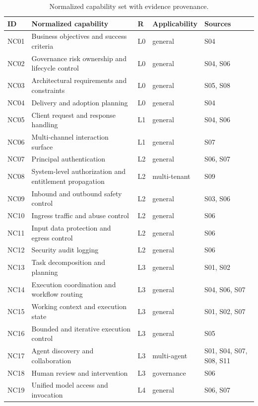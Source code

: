 \begin{table}[t]
\centering
\caption{Normalized capability set with evidence provenance.}
\label{tab:capability-set}
\scriptsize
\begin{tabular}{p{} p{} p{} p{} p{}}
\hline
\textbf{ID} & \textbf{Normalized capability} & \textbf{R} & \textbf{Applicability} & \textbf{Sources} \\
\hline
NC01 & Business objectives and success criteria & L0 & general & S04 \\
NC02 & Governance risk ownership and lifecycle control & L0 & general & S04, S06 \\
NC03 & Architectural requirements and constraints & L0 & general & S05, S08 \\
NC04 & Delivery and adoption planning & L0 & general & S04 \\
NC05 & Client request and response handling & L1 & general & S04, S06 \\
NC06 & Multi-channel interaction surface & L1 & general & S07 \\
NC07 & Principal authentication & L2 & general & S06, S07 \\
NC08 & System-level authorization and entitlement propagation & L2 & multi-tenant & S09 \\
NC09 & Inbound and outbound safety control & L2 & general & S03, S06 \\
NC10 & Ingress traffic and abuse control & L2 & general & S06 \\
NC11 & Input data protection and egress control & L2 & general & S06 \\
NC12 & Security audit logging & L2 & general & S06 \\
NC13 & Task decomposition and planning & L3 & general & S01, S02 \\
NC14 & Execution coordination and workflow routing & L3 & general & S04, S06, S07 \\
NC15 & Working context and execution state & L3 & general & S01, S02, S07 \\
NC16 & Bounded and iterative execution control & L3 & general & S05 \\
NC17 & Agent discovery and collaboration & L3 & multi-agent & S01, S04, S07, S08, S11 \\
NC18 & Human review and intervention & L3 & governance & S06 \\
NC19 & Unified model access and invocation & L4 & general & S06, S07 \\

\end{tabular}
\end{table}
